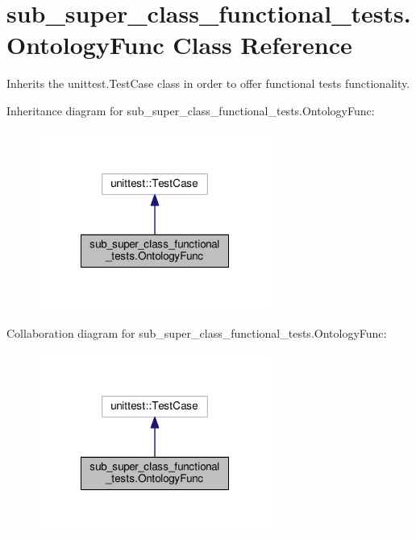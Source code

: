 \hypertarget{classsub__super__class__functional__tests_1_1OntologyFunc}{\section{sub\-\_\-super\-\_\-class\-\_\-functional\-\_\-tests.\-Ontology\-Func Class Reference}
\label{classsub__super__class__functional__tests_1_1OntologyFunc}
}


Inherits the unittest.\-Test\-Case class in order to offer functional tests functionality.  




Inheritance diagram for sub\-\_\-super\-\_\-class\-\_\-functional\-\_\-tests.\-Ontology\-Func\-:
\nopagebreak
\begin{figure}[H]
\begin{center}
\leavevmode
\includegraphics[width=216pt]{classsub__super__class__functional__tests_1_1OntologyFunc__inherit__graph}
\end{center}
\end{figure}


Collaboration diagram for sub\-\_\-super\-\_\-class\-\_\-functional\-\_\-tests.\-Ontology\-Func\-:
\nopagebreak
\begin{figure}[H]
\begin{center}
\leavevmode
\includegraphics[width=216pt]{classsub__super__class__functional__tests_1_1OntologyFunc__coll__graph}
\end{center}
\end{figure}
